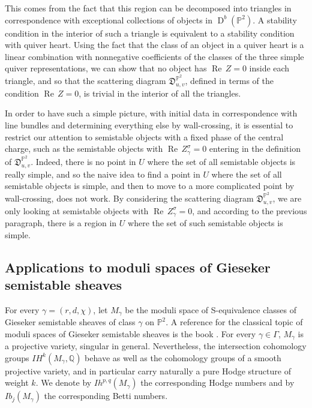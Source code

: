\documentclass[12pt, a4paper]{amsart}
\newcommand\PP{\mathbb P}
\newcommand\Q{\mathbb Q}
\newcommand\fD{\mathfrak D}
\newcommand\Rea{\operatorname{Re}\,}
\newcommand\D{\operatorname{D}}
\begin{document}
This comes from the fact that this region can be decomposed into triangles
in correspondence with exceptional collections of objects in $\D^b(\PP^2)$.  A stability condition 
in the interior of such a triangle is equivalent to a
stability condition with quiver heart.
Using the fact that the class of an object in a quiver heart 
is a linear combination with nonnegative coefficients of the classes of the three simple quiver representations, 
we can show that no object has $\Rea Z=0$ inside each triangle, 
and 
so that the scattering diagram $\fD^{\PP^2}_{u,v}$,
defined in terms of the condition 
$\Rea Z=0$, is trivial in the interior of all the triangles.


In order to have such a simple picture, 
with initial data in correspondence with line bundles and determining everything 
else by wall-crossing, 
it is essential to restrict our attention to semistable objects with a fixed phase of the central charge, such as the semistable objects with $\Rea Z_\gamma^\sigma=0$ entering in the definition of $\fD^{\PP^2}_{u,v}$. 
Indeed, there is no point in $U$ where the set of all semistable objects is really simple, 
and so the naive idea to find a point in $U$ where the set of all semistable objects is simple, 
and then to move to a more complicated point by wall-crossing, does not work. By considering the scattering diagram 
$\fD^{\PP^2}_{u,v}$, we are only looking at semistable objects with $\Rea Z_\gamma^\sigma=0$, and according to the previous paragraph, there is a region in $U$ where the set of such semistable objects is simple.  


\subsection{Applications to moduli spaces of Gieseker semistable sheaves}
\label{section_intro_gieseker}

For every $\gamma=(r,d,\chi)$, let 
$M_\gamma$ be the moduli space of S-equivalence classes of Gieseker semistable sheaves of class $\gamma$ on $\PP^2$. A reference for the classical topic of moduli spaces of Gieseker semistable sheaves is the book \cite{huybrechts2010geometry}. For every 
$\gamma \in \Gamma$, $M_\gamma$ is a projective variety, singular in general.
Nevertheless, the intersection cohomology groups $IH^{k}(M_\gamma, \Q)$
behave as well as the cohomology groups of a smooth projective variety, and in particular carry naturally a pure Hodge structure of weight $k$. We denote by $Ih^{p,q}(M_\gamma)$
the corresponding Hodge numbers and by $Ib_j(M_\gamma)$ the corresponding Betti numbers.
\end{document}
